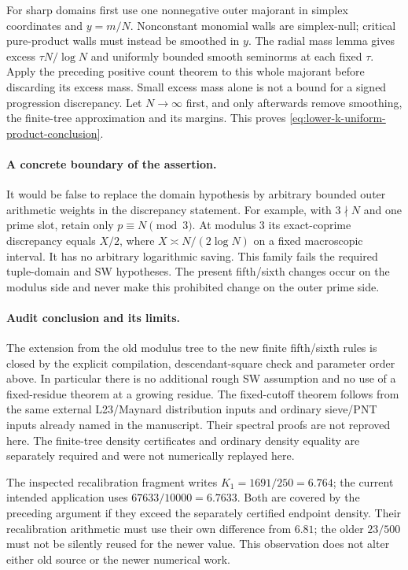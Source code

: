 For sharp domains first use one nonnegative outer majorant in simplex
coordinates and $y=m/N$. Nonconstant monomial walls are simplex-null;
critical pure-product walls must instead be smoothed in $y$.
The radial mass lemma gives excess $\tau N/\log N$ and uniformly
bounded smooth seminorms at each fixed $\tau$. Apply the preceding
positive count theorem to this whole majorant before discarding its
excess mass. Small excess mass alone is not a bound for a signed
progression discrepancy. Let $N\to\infty$ first, and only afterwards
remove smoothing, the finite-tree approximation and its margins.
This proves \eqref{eq:lower-k-uniform-product-conclusion}.

\paragraph{A concrete boundary of the assertion.}
It would be false to replace the domain hypothesis by arbitrary bounded
outer arithmetic weights in the discrepancy statement. For example,
with $3\nmid N$ and one prime slot, retain only $p\equiv N\pmod3$.
At modulus $3$ its exact-coprime discrepancy equals $X/2$, where
$X\asymp N/(2\log N)$ on a fixed macroscopic interval. It has no
arbitrary logarithmic saving. This family fails the required tuple-domain
and SW hypotheses. The present fifth/sixth changes occur on the modulus
side and never make this prohibited change on the outer prime side.

\paragraph{Audit conclusion and its limits.}
The extension from the old modulus tree to the new finite fifth/sixth
rules is closed by the explicit compilation, descendant-square check
and parameter order above. In particular there is no additional rough
SW assumption and no use of a fixed-residue theorem at a growing
residue. The fixed-cutoff theorem follows from the same external
L23/Maynard distribution inputs and ordinary sieve/PNT inputs already
named in the manuscript. Their spectral proofs are not reproved here.
The finite-tree density certificates and ordinary density equality
are separately required and were not numerically replayed here.

The inspected recalibration fragment writes $K_1=1691/250=6.764$;
the current intended application uses $67633/10000=6.7633$.
Both are covered by the preceding argument if they exceed the
separately certified endpoint density. Their recalibration arithmetic
must use their own difference from $6.81$; the older $23/500$ must not
be silently reused for the newer value. This observation does not
alter either old source or the newer numerical work.
